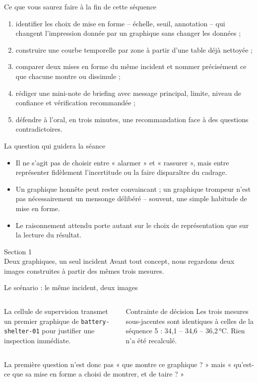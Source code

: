 \documentclass[aspectratio=169]{beamer}
\begin{document}
\begin{frame}{Ce que vous saurez faire à la fin de cette séquence}
  \begin{enumerate}
    \item identifier les choix de mise en forme -- échelle, seuil, annotation -- qui changent l'impression donnée par un graphique sans changer les données ;
    \item construire une courbe temporelle par zone à partir d'une table déjà nettoyée ;
    \item comparer deux mises en forme du même incident et nommer précisément ce que chacune montre ou dissimule ;
    \item rédiger une mini-note de briefing avec message principal, limite, niveau de confiance et vérification recommandée ;
    \item défendre à l'oral, en trois minutes, une recommandation face à des questions contradictoires.
  \end{enumerate}
\end{frame}

\begin{frame}{La question qui guidera la séance}
  \begin{itemize}
    \item Il ne s'agit pas de choisir entre « alarmer » et « rassurer », mais entre représenter fidèlement l'incertitude ou la faire disparaître du cadrage.
    \item Un graphique honnête peut rester convaincant ; un graphique trompeur n'est pas nécessairement un mensonge délibéré -- souvent, une simple habitude de mise en forme.
    \item Le raisonnement attendu porte autant sur le choix de représentation que sur la lecture du résultat.
  \end{itemize}
\end{frame}

\begin{frame}[plain]
  \centering
  \Huge Section 1\\[3mm]
  \Large Deux graphiques, un seul incident
  \vfill
  \normalsize Avant tout concept, nous regardons deux images construites à partir des mêmes trois mesures.
\end{frame}

\begin{frame}{Le scénario : le même incident, deux images}
  \begin{columns}[T]
    La cellule de supervision transmet un premier graphique de \texttt{battery-shelter-01} pour justifier une inspection immédiate.
    \begin{block}{Contrainte de décision}
      Les trois mesures sous-jacentes sont identiques à celles de la séquence 5 : 34,1 -- 34,6 -- 36,2\,°C. Rien n'a été recalculé.
    \end{block}
  \end{columns}
  \vfill
  \alert{La première question n'est donc pas « que montre ce graphique ? » mais « qu'est-ce que sa mise en forme a choisi de montrer, et de taire ? »}
\end{frame}
\end{document}
